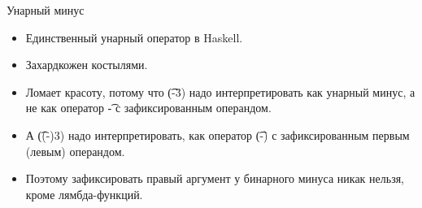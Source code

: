 \begin{frame}{Унарный минус}
	\begin{itemize}
		\item Единственный унарный оператор в Haskell.
		\item Захардкожен костылями.
		\item Ломает красоту, потому что \t{(-3)} надо интерпретировать как унарный минус, а не как оператор \t{-} с зафиксированным операндом.
		\item А \t{((-)3)} надо интерпретировать, как оператор \t{(-)} с зафиксированным первым (левым) операндом.
		\item Поэтому зафиксировать правый аргумент у бинарного минуса никак нельзя, кроме лямбда-функций.
	\end{itemize}
\end{frame}
